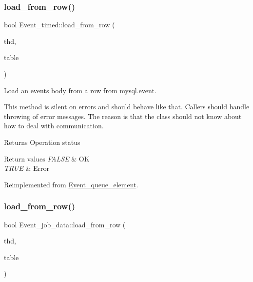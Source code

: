 \subsubsection{\texorpdfstring{load\+\_\+from\+\_\+row()}{load\_from\_row()}\hspace{0.1cm}{\footnotesize\ttfamily [2/3]}}
{\footnotesize\ttfamily bool Event\+\_\+timed\+::load\+\_\+from\+\_\+row (\begin{DoxyParamCaption}\item[{T\+HD $\ast$}]{thd,  }\item[{\mbox{\hyperlink{structTABLE}{T\+A\+B\+LE}} $\ast$}]{table }\end{DoxyParamCaption})\hspace{0.3cm}{\ttfamily [virtual]}}

Load an event\textquotesingle{}s body from a row from mysql.\+event.

This method is silent on errors and should behave like that. Callers should handle throwing of error messages. The reason is that the class should not know about how to deal with communication.

\begin{DoxyReturn}{Returns}
Operation status 
\end{DoxyReturn}

\begin{DoxyRetVals}{Return values}
{\em F\+A\+L\+SE} & OK \\
\hline
{\em T\+R\+UE} & Error \\
\hline
\end{DoxyRetVals}


Reimplemented from \mbox{\hyperlink{group__Event__Scheduler_ga2ac60939979bc9d825bbf5d77b3c3025}{Event\+\_\+queue\+\_\+element}}.

\mbox{\label{group__Event__Scheduler_gab1ac4ae01202ed7bd65cf20736a95ebd}} 
\subsubsection{\texorpdfstring{load\+\_\+from\+\_\+row()}{load\_from\_row()}\hspace{0.1cm}{\footnotesize\ttfamily [3/3]}}
{\footnotesize\ttfamily bool Event\+\_\+job\+\_\+data\+::load\+\_\+from\+\_\+row (\begin{DoxyParamCaption}\item[{T\+HD $\ast$}]{thd,  }\item[{\mbox{\hyperlink{structTABLE}{T\+A\+B\+LE}} $\ast$}]{table }\end{DoxyParamCaption})\hspace{0.3cm}{\ttfamily [virtual]}}

